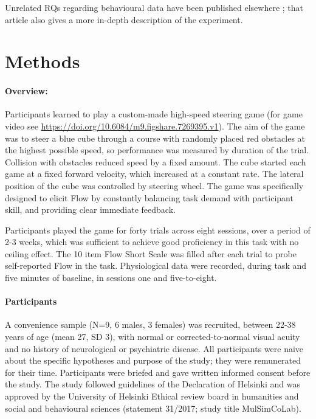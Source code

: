 \documentclass[10pt,letterpaper,floatsintext]{article}
\begin{document}
Unrelated RQs regarding behavioural data have been published elsewhere \cite{Cowley2019flow}; that article also gives a more in-depth description of the experiment.

\section{Methods}

\paragraph{Overview:}
Participants learned to play a custom-made high-speed steering game (for game video see \url{https://doi.org/10.6084/m9.figshare.7269395.v1}). The aim of the game was to steer a blue cube through a course with randomly placed red obstacles at the highest possible speed, so performance was measured by duration of the trial. Collision with obstacles reduced speed by a fixed amount. The cube started each game at a fixed forward velocity, which increased at a constant rate. The lateral position of the cube was controlled by steering wheel. The game was specifically designed to elicit Flow by constantly balancing task demand with participant skill, and providing clear immediate feedback.

Participants played the game for forty trials across eight sessions, over a period of 2-3 weeks, which was sufficient to achieve good proficiency in this task with no ceiling effect. The 10 item Flow Short Scale \cite{Engeser2008} was filled after each trial to probe self-reported Flow in the task. Physiological data were recorded, during task and five minutes of baseline, in sessions one and five-to-eight.


\paragraph{Participants}
A convenience sample (N=9, 6 males, 3 females) was recruited, between 22-38 years of age (mean 27, SD 3), with normal or corrected-to-normal visual acuity and no history of neurological or psychiatric disease. All participants were naive about the specific hypotheses and purpose of the study; they were remunerated for their time. Participants were briefed and gave written informed consent before the study. The study followed guidelines of the Declaration of Helsinki and was approved by the University of Helsinki Ethical review board in humanities and social and behavioural sciences (statement 31/2017; study title MulSimCoLab).
\end{document}
